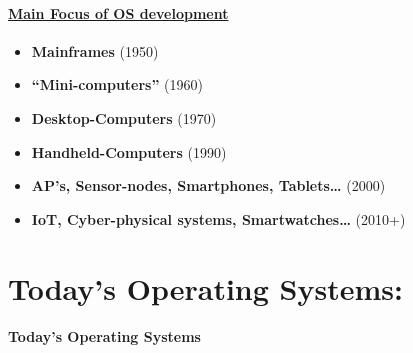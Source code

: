 \documentclass[
]{article}
\providecommand{\tightlist}{%
  \setlength{\itemsep}{0pt}\setlength{\parskip}{0pt}}
\begin{document}
\hypertarget{main-focus-of-os-development}{%
\paragraph{\texorpdfstring{\href{https://en.wikipedia.org/wiki/Timeline_of_operating_systems}{Main
Focus of OS
development}}{Main Focus of OS development}}\label{main-focus-of-os-development}}

\begin{itemize}
\tightlist
\item
  \textbf{Mainframes} (1950)
\item
  \textbf{``Mini-computers''} (1960)
\item
  \textbf{Desktop-Computers} (1970)
\item
  \textbf{Handheld-Computers} (1990)
\item
  \textbf{AP's, Sensor-nodes, Smartphones, Tablets\ldots{}} (2000)
\item
  \textbf{IoT, Cyber-physical systems, Smartwatches\ldots{}} (2010+)
\end{itemize}

\newpage
\hypertarget{todays-operating-systems}{%
\section{Today's Operating Systems:}\label{todays-operating-systems}}

\hypertarget{todays-operating-systems-1}{%
\paragraph{Today's Operating Systems}\label{todays-operating-systems-1}}
\end{document}

